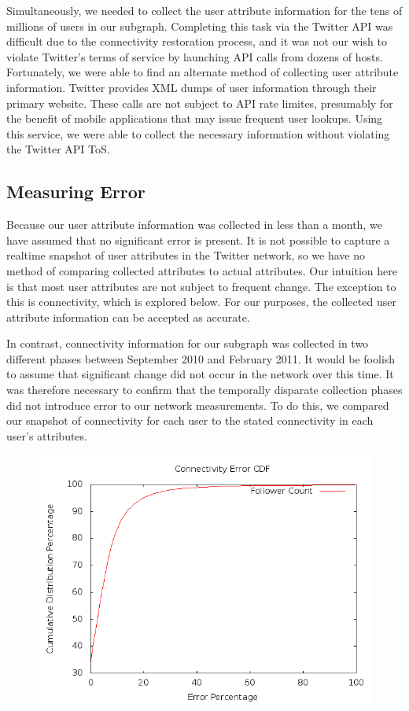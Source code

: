 Simultaneously, we needed to collect the user attribute information for the tens of millions of users in our subgraph.  Completing this task via the Twitter API was difficult due to the connectivity restoration process, and it was not our wish to violate Twitter's terms of service by launching API calls from dozens of hosts.  Fortunately, we were able to find an alternate method of collecting user attribute information.  Twitter provides XML dumps of user information through their primary website.  These calls are not subject to API rate limites, presumably for the benefit of mobile applications that may issue frequent user lookups.  Using this service, we were able to collect the necessary information without violating the Twitter API ToS.

\subsection{Measuring Error}

Because our user attribute information was collected in less than a month, we have assumed that no significant error is present.  It is not possible to capture a realtime snapshot of user attributes in the Twitter network, so we have no method of comparing collected attributes to actual attributes.  Our intuition here is that most user attributes are not subject to frequent change.  The exception to this is connectivity, which is explored below.  For our purposes, the collected user attribute information can be accepted as accurate.

In contrast, connectivity information for our subgraph was collected in two different phases between September 2010 and February 2011.  It would be foolish to assume that significant change did not occur in the network over this time.  It was therefore necessary to confirm that the temporally disparate collection phases did not introduce error to our network measurements.  To do this, we compared our snapshot of connectivity for each user to the stated connectivity in each user's attributes.

\begin{figure}
 \centering
 \includegraphics[bb=0 0 640 480,scale=.3]{./images/Bates-Final/CDF.png}
 \label{fig:cdf}
\end{figure}

